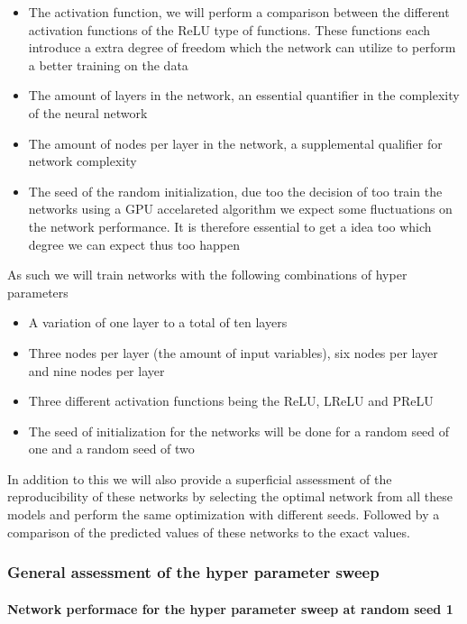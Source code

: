 \documentclass[]{article}
\begin{document}
\begin{itemize}
\item The activation function, we will perform a comparison between the different activation functions of the ReLU type of functions. These functions each introduce a extra degree of freedom which the network can utilize to perform a better training on the data
\item The amount of layers in the network, an essential quantifier in the complexity of the neural network
\item The amount of nodes per layer in the network, a supplemental qualifier for network complexity
\item The seed of the random initialization, due too the decision of too train the networks using a GPU accelareted algorithm we expect some fluctuations on the network performance. It is therefore essential to get a idea too which degree we can expect thus too happen 
\end{itemize}
As such we will train networks with the following combinations of hyper parameters
\begin{itemize}
	\item A variation of one layer to a total of ten layers
	\item Three nodes per layer (the amount of input variables), six nodes per layer and nine nodes per layer
	\item Three different activation functions being the ReLU, LReLU and PReLU
	\item The seed of initialization for the networks will be done for a random seed of one and a random seed of two
\end{itemize}
In addition to this we will also provide a superficial assessment of the reproducibility of these networks by selecting the optimal network from all these models and perform the same optimization with different seeds. Followed by a comparison of the predicted values of these networks to the exact values. 

\subsubsection{General assessment of the hyper parameter sweep}

\paragraph{Network performace for the hyper parameter sweep at random seed 1}
\end{document}
